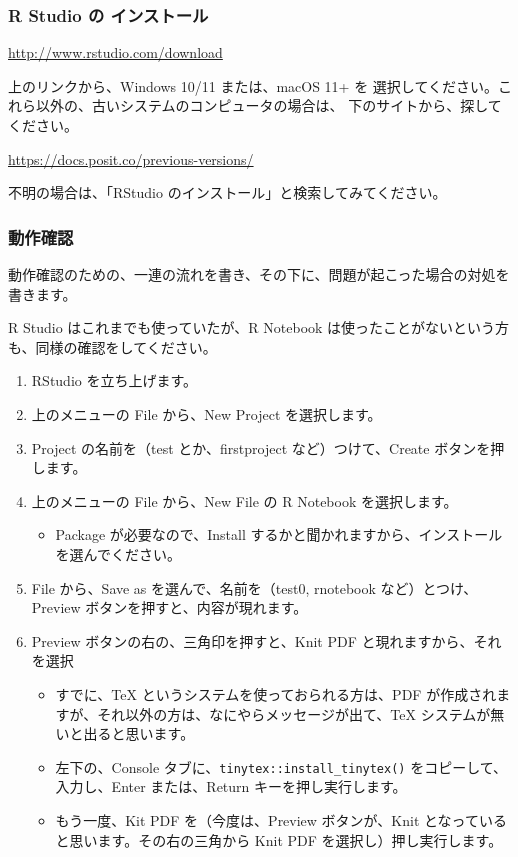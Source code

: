 \documentclass[
]{bxjsbook}
\providecommand{\tightlist}{%
  \setlength{\itemsep}{0pt}\setlength{\parskip}{0pt}}
\theoremstyle{definition}
\theoremstyle{definition}
\theoremstyle{definition}
\theoremstyle{definition}
\theoremstyle{remark}
\begin{document}
\hypertarget{r-studio-ux306e-ux30a4ux30f3ux30b9ux30c8ux30fcux30eb}{%
\subsubsection{R Studio の インストール}\label{r-studio-ux306e-ux30a4ux30f3ux30b9ux30c8ux30fcux30eb}}

\url{http://www.rstudio.com/download}

上のリンクから、Windows 10/11 または、macOS 11+ を 選択してください。これら以外の、古いシステムのコンピュータの場合は、 下のサイトから、探してください。

\url{https://docs.posit.co/previous-versions/}

不明の場合は、「RStudio のインストール」と検索してみてください。

\hypertarget{ux52d5ux4f5cux78baux8a8d}{%
\subsubsection{動作確認}\label{ux52d5ux4f5cux78baux8a8d}}

動作確認のための、一連の流れを書き、その下に、問題が起こった場合の対処を書きます。

R Studio はこれまでも使っていたが、R Notebook は使ったことがないという方も、同様の確認をしてください。

\begin{enumerate}
\def\labelenumi{\arabic{enumi}.}
\tightlist
\item
  RStudio を立ち上げます。
\item
  上のメニューの File から、New Project を選択します。
\item
  Project の名前を（test とか、firstproject など）つけて、Create ボタンを押します。
\item
  上のメニューの File から、New File の R Notebook を選択します。

  \begin{itemize}
  \tightlist
  \item
    Package が必要なので、Install するかと聞かれますから、インストールを選んでください。
  \end{itemize}
\item
  File から、Save as を選んで、名前を（test0, rnotebook など）とつけ、Preview ボタンを押すと、内容が現れます。
\item
  Preview ボタンの右の、三角印を押すと、Knit PDF と現れますから、それを選択

  \begin{itemize}
  \tightlist
  \item
    すでに、TeX というシステムを使っておられる方は、PDF が作成されますが、それ以外の方は、なにやらメッセージが出て、TeX システムが無いと出ると思います。
  \item
    左下の、Console タブに、\texttt{tinytex::install\_tinytex()} をコピーして、入力し、Enter または、Return キーを押し実行します。
  \item
    もう一度、Kit PDF を（今度は、Preview ボタンが、Knit となっていると思います。その右の三角から Knit PDF を選択し）押し実行します。
  \end{itemize}
\end{enumerate}
\end{document}
